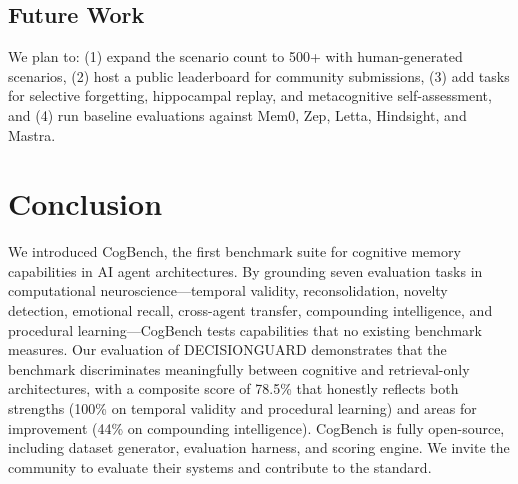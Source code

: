 \documentclass{article}
\begin{document}
\subsection{Future Work}

We plan to: (1) expand the scenario count to 500+ with human-generated scenarios, (2) host a public leaderboard for community submissions, (3) add tasks for selective forgetting, hippocampal replay, and metacognitive self-assessment, and (4) run baseline evaluations against Mem0, Zep, Letta, Hindsight, and Mastra.

\section{Conclusion}
\label{sec:conclusion}

We introduced CogBench, the first benchmark suite for cognitive memory capabilities in AI agent architectures. By grounding seven evaluation tasks in computational neuroscience---temporal validity, reconsolidation, novelty detection, emotional recall, cross-agent transfer, compounding intelligence, and procedural learning---CogBench tests capabilities that no existing benchmark measures. Our evaluation of DECISIONGUARD demonstrates that the benchmark discriminates meaningfully between cognitive and retrieval-only architectures, with a composite score of 78.5\% that honestly reflects both strengths (100\% on temporal validity and procedural learning) and areas for improvement (44\% on compounding intelligence). CogBench is fully open-source, including dataset generator, evaluation harness, and scoring engine. We invite the community to evaluate their systems and contribute to the standard.



\end{document}
